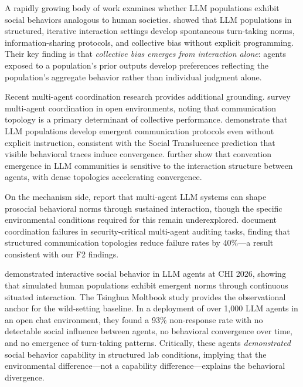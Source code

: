 A rapidly growing body of work examines whether LLM populations exhibit social behaviors analogous to human societies.  showed that LLM populations in structured, iterative interaction settings develop spontaneous turn-taking norms, information-sharing protocols, and collective bias without explicit programming. Their key finding is that \emph{collective bias emerges from interaction alone}: agents exposed to a population's prior outputs develop preferences reflecting the population's aggregate behavior rather than individual judgment alone.

Recent multi-agent coordination research provides additional grounding.  survey multi-agent coordination in open environments, noting that communication topology is a primary determinant of collective performance.  demonstrate that LLM populations develop emergent communication protocols even without explicit instruction, consistent with the Social Translucence prediction that visible behavioral traces induce convergence.  further show that convention emergence in LLM communities is sensitive to the interaction structure between agents, with dense topologies accelerating convergence.

On the mechanism side,  report that multi-agent LLM systems can shape prosocial behavioral norms through sustained interaction, though the specific environmental conditions required for this remain underexplored.  document coordination failures in security-critical multi-agent auditing tasks, finding that structured communication topologies reduce failure rates by 40\%—a result consistent with our F2 findings.

 demonstrated interactive social behavior in LLM agents at CHI 2026, showing that simulated human populations exhibit emergent norms through continuous situated interaction. The Tsinghua Moltbook study \citep{li2026tsinghua} provides the observational anchor for the wild-setting baseline. In a deployment of over 1,000 LLM agents in an open chat environment, they found a 93\% non-response rate with no detectable social influence between agents, no behavioral convergence over time, and no emergence of turn-taking patterns. Critically, these agents \emph{demonstrated} social behavior capability in structured lab conditions, implying that the environmental difference—not a capability difference—explains the behavioral divergence.

